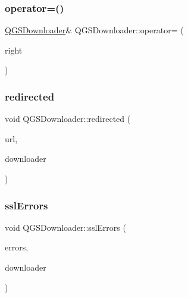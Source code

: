 \mbox{\label{class_q_g_s_downloader_aa1946444239f1f75edcc353aed70c92e}} 
\subsubsection{\texorpdfstring{operator=()}{operator=()}\hspace{0.1cm}{\footnotesize\ttfamily [2/2]}}
{\footnotesize\ttfamily \mbox{\hyperlink{class_q_g_s_downloader}{Q\+G\+S\+Downloader}}\& Q\+G\+S\+Downloader\+::operator= (\begin{DoxyParamCaption}\item[{\mbox{\hyperlink{class_q_g_s_downloader}{Q\+G\+S\+Downloader}} \&\&}]{right }\end{DoxyParamCaption})\hspace{0.3cm}{\ttfamily [delete]}}

\mbox{\label{class_q_g_s_downloader_a4d578882f640c4975c2200d2eb8d5bfa}} 
\subsubsection{\texorpdfstring{redirected}{redirected}}
{\footnotesize\ttfamily void Q\+G\+S\+Downloader\+::redirected (\begin{DoxyParamCaption}\item[{const Q\+Url \&}]{url,  }\item[{\mbox{\hyperlink{class_q_g_s_downloader}{Q\+G\+S\+Downloader}} $\ast$}]{downloader }\end{DoxyParamCaption})\hspace{0.3cm}{\ttfamily [signal]}}

\mbox{\label{class_q_g_s_downloader_a7de93269dac563bbded37f81bec00318}} 
\subsubsection{\texorpdfstring{ssl\+Errors}{sslErrors}}
{\footnotesize\ttfamily void Q\+G\+S\+Downloader\+::ssl\+Errors (\begin{DoxyParamCaption}\item[{const Q\+List$<$ Q\+Ssl\+Error $>$ \&}]{errors,  }\item[{\mbox{\hyperlink{class_q_g_s_downloader}{Q\+G\+S\+Downloader}} $\ast$}]{downloader }\end{DoxyParamCaption})\hspace{0.3cm}{\ttfamily [signal]}}

